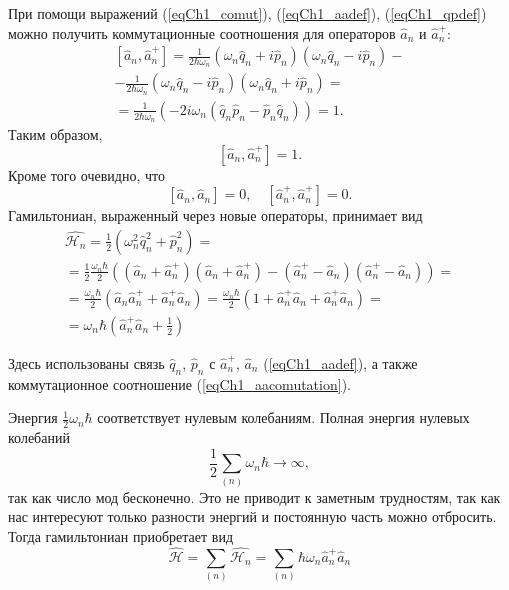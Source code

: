 При помощи выражений (\ref{eqCh1_comut}), 
(\ref{eqCh1_aadef}), (\ref{eqCh1_qpdef}) можно получить коммутационные
соотношения для операторов $\hat{a}_n$ и $\hat{a}_n^{+}$: 
\begin{eqnarray}
\left[\hat{a}_n, \hat{a}_n^{+}\right] = 
\frac{1}{2 \hbar \omega_n}
\left( \omega_n \hat{q}_n + i \hat{p}_n\right) 
\left( \omega_n \hat{q}_n - i \hat{p}_n\right) - 
\nonumber \\
- \frac{1}{2 \hbar \omega_n}
\left( \omega_n \hat{q}_n - i \hat{p}_n\right) 
\left( \omega_n \hat{q}_n + i \hat{p}_n\right) =
\nonumber \\
= \frac{1}{2 \hbar \omega_n}
\left( - 2 i \omega_n 
\left(\hat{q}_n \hat{p}_n - \hat{p}_n \hat{q}_n\right)\right) = 1.
\end{eqnarray}
Таким образом,
\begin{equation}
\left[\hat{a}_n, \hat{a}_n^{+}\right] = 1.
\label{eqCh1_aacomutation}
\end{equation}
Кроме того очевидно, что
\begin{equation}
\left[\hat{a}_n, \hat{a}_n\right] = 0,
\quad
\left[\hat{a}_n^{+}, \hat{a}_n^{+}\right] = 0.
\end{equation}
Гамильтониан, выраженный через новые операторы, принимает вид
\begin{eqnarray}
\hat{\mathcal{H}_n} = 
\frac{1}{2}\left(\omega_n^2 \hat{q}_n^2 + \hat{p}_n^2\right) = 
\nonumber \\
= \frac{1}{2}\frac{\omega_n \hbar}{2}
\left(
\left(\hat{a}_n + \hat{a}_n^{+} \right)
\left(\hat{a}_n + \hat{a}_n^{+} \right)
-
\left(\hat{a}_n^{+} - \hat{a}_n \right)
\left(\hat{a}_n^{+} - \hat{a}_n \right)
\right) =
\nonumber \\
= \frac{\omega_n \hbar}{2} 
\left( \hat{a}_n \hat{a}_n^{+} + \hat{a}_n^{+} \hat{a}_n\right) =
\frac{\omega_n \hbar}{2} 
\left(1 + \hat{a}_n^{+} \hat{a}_n + \hat{a}_n^{+} \hat{a}_n\right) =
\nonumber \\
= \omega_n \hbar 
\left(\hat{a}_n^{+} \hat{a}_n + \frac{1}{2}\right)
\label{eqCh1_quant_stoyachie_volny}
\end{eqnarray}


Здесь использованы связь  $\hat{q}_n$, $\hat{p}_n$ 
с $\hat{a}_n^{+}$, $\hat{a}_n$ (\ref{eqCh1_aadef}), а также
коммутационное соотношение (\ref{eqCh1_aacomutation}). 

Энергия $\frac{1}{2}\omega_n \hbar$ соответствует нулевым
колебаниям. Полная энергия нулевых колебаний
\[
\frac{1}{2}\sum_{(n)}\omega_n \hbar \to \infty,
\] 
так как число мод бесконечно. Это не приводит к 
заметным трудностям, так как нас интересуют только разности
энергий и постоянную часть можно отбросить. Тогда гамильтониан
приобретает вид 
\begin{equation}
\hat{\mathcal{H}} = \sum_{(n)}\hat{\mathcal{H}_n} =
\sum_{(n)}\hbar \omega_n \hat{a}_n^{+}\hat{a}_n
\end{equation}

